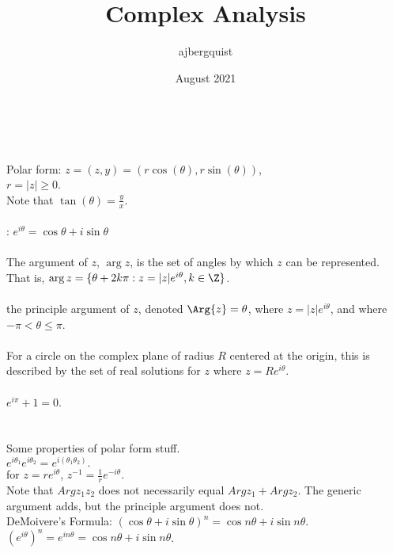 \documentclass{article}
\title{Complex Analysis}
\author{ajbergquist }
\date{August 2021}
\begin{document}
\\
\\

 Polar form: $z = (z,y) = (r\cos(\theta),r\sin(\theta))$,\\
$r = |z|\ge 0$.\\
Note that $\tan(\theta) = \frac{y}{x}$.\\

\\
: $e^{i\theta} = \cos{\theta}+i\sin{\theta}$\\
\\
 The argument of $z$, $\arg{z}$, is the set of angles by which $z$ can be represented. That is, $\arg{z} = \{\theta+2k\pi:z=|z|e^{i\theta},k\in \Z\}$.\\
\\
 the principle argument of $z$, denoted $\Arg{z} = \theta$, where $z=|z|e^{i\theta}$, and where $-\pi <\theta\le \pi$.\\
\\
 For a circle on the complex plane of radius $R$ centered at the origin, this is described by the set of real solutions for $z$ where $z = Re^{i\theta}$.\\
\\

 $e^{i\pi} + 1 = 0$.
\\\\

\\

 Some properties of polar form stuff. \\
$e^{i\theta_1}e^{i\theta_2} = e^{i(\theta_1\theta_2)}. $\\
for $z= re^{i\theta}$, $z^{-1} = \frac{1}{r}e^{-i\theta}.$ \\
Note that $Argz_1z_2$ does not necessarily equal $Argz_1 + Argz_2$. The generic argument adds, but the principle argument does not.\\
 DeMoivere's Formula: $(\cos\theta+i\sin\theta)^n = \cos n \theta + i\sin n \theta.$\\
$(e^{i\theta})^n = e^{in\theta} = \cos n \theta + i\sin n \theta$.
\end{document}
